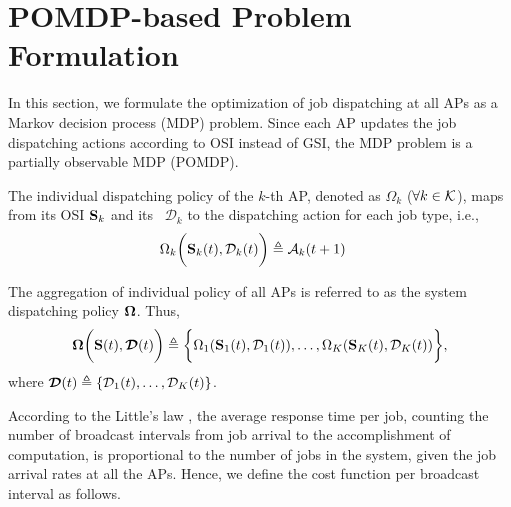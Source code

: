 \section{POMDP-based Problem Formulation}
\label{sec:formulation}
In this section, we formulate the optimization of job dispatching at all APs as a Markov decision process (MDP) problem.
Since each AP updates the job dispatching actions according to OSI instead of GSI, the MDP problem is a partially observable MDP (POMDP).
%

\begin{definition}
    The individual dispatching policy of the $k$-th AP, denoted as $\Omega_{k}$ ($\forall k \in\mathcal{K}$), maps from its OSI $\mathbf{S}_{k}$ and its \brlatency~$\mathcal{D}_{k}$ to the dispatching action for each job type, i.e.,
    {\small
    \begin{align}
        \Omega_{k} \bigg( \mathbf{S}_{k}(t), \mathcal{D}_{k}(t) \bigg)
        &\triangleq \mathcal{A}_{k}(t+1)
        \label{def:action}
    \end{align}
    }%

    The aggregation of individual policy of all APs is referred to as the system dispatching policy $\boldsymbol{\Omega}$.
    Thus,
    {\small
    \begin{align}
        \boldsymbol{\Omega}\bigg( \mathbf{S}(t), \boldsymbol{\mathcal{D}}(t) \bigg) \triangleq \bigg\{
            \Omega_{1}(\mathbf{S}_{1}(t), \mathcal{D}_{1}(t)), \dots, \Omega_{K}(\mathbf{S}_{K}(t),\mathcal{D}_{K}(t))
        \bigg\},
    \end{align}
    }%
    where $\boldsymbol{\mathcal{D}}(t) \triangleq \{ \mathcal{D}_{1}(t), \dots, \mathcal{D}_{K}(t) \}$.
\end{definition}

According to the Little's law \cite{Little1961}, the average response time per job, counting the number of broadcast intervals from job arrival to the accomplishment of computation, is proportional to the number of jobs in the system, given the job arrival rates at all the APs.
Hence,%
we define the cost function per broadcast interval as follows.

